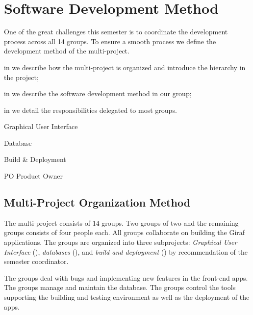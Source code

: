 \chapter{Software Development Method}\label{chap:sw_dev_method}
One of the great challenges this semester is to coordinate the development process across all 14 groups. To ensure a smooth process we define the development method of the multi-project.


\begin{chapterorganization}
  \item in  we describe how the multi-project is organized and introduce the hierarchy in the project;
  \item in  we describe the software development method in our group;
  \item in  we detail the responsibilities delegated to most groups.
\end{chapterorganization}

\begin{abbreviations}
  \item[\gui] Graphical User Interface
  \item[\db] Database
  \item[\bd] Build \& Deployment
  \item[PO] Product Owner
\end{abbreviations}

\section{Multi-Project Organization Method}\label{sec:project_overview}
The multi-project consists of 14 groups. Two groups of two and the remaining groups consists of four people each.  All groups collaborate on building the Giraf applications. The groups are organized into three subprojects: \emph{Graphical User Interface} (\gui), \emph{databases} (\db), and \emph{build and deployment} (\bd) by recommendation of the semester coordinator.

The \gui groups deal with bugs and implementing new features in the front-end apps. The \db groups manage and maintain the database. The \bd groups control the tools supporting the building and testing environment as well as the deployment of the apps.

